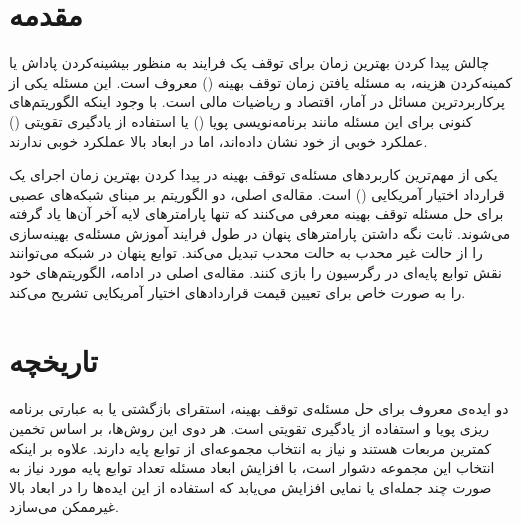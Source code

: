 \documentclass[hidelinks, 11pt]{article}
\author{علیرضا عظیمی‌نیا $401\,205\,061$ \\ کیانا عسگری $97\,100\,473$}
\date{}
\title{\lr{Optimal Stopping via Randomized Neural Networks}}
\begin{document}
\maketitle

\section{مقدمه}
\label{sec:org43aa378}

چالش پیدا کردن بهترین زمان برای توقف یک فرایند به منظور بیشینه‌کردن
پاداش یا کمینه‌کردن هزینه، به مسئله یافتن زمان توقف بهینه
() معروف است.  این مسئله یکی از
پرکاربردترین مسائل در آمار، اقتصاد و ریاضیات مالی است.  با وجود
اینکه الگوریتم‌های کنونی برای این مسئله مانند برنامه‌نویسی پویا
() یا استفاده از یادگیری تقویتی
() عملکرد خوبی از خود نشان داده‌اند، اما در
ابعاد بالا عملکرد خوبی ندارند.

یکی از مهم‌ترین کاربردهای مسئله‌ی توقف بهینه در پیدا کردن بهترین زمان
اجرای یک قرارداد اختیار آمریکایی () است.
مقاله‌ی اصلی، دو الگوریتم بر مبنای شبکه‌های عصبی برای حل مسئله توقف بهینه
معرفی می‌کنند که تنها پارامترهای لایه آخر آن‌ها یاد گرفته می‌شوند.  ثابت
نگه داشتن پارامترهای پنهان در طول فرایند آموزش مسئله‌ی بهینه‌سازی را از
حالت غیر محدب به حالت محدب تبدیل می‌کند.  توابع پنهان در شبکه می‌توانند
نقش توابع پایه‌ای در رگرسیون را بازی کنند.  مقاله‌ی اصلی در ادامه،
الگوریتم‌های خود را به صورت خاص برای تعیین قیمت قراردادهای اختیار
آمریکایی تشریح می‌کند.

\section{تاریخچه}
\label{sec:orgfb561e4}

دو ایده‌ی معروف برای حل مسئله‌ی توقف بهینه، استقرای بازگشتی یا به عبارتی
برنامه ریزی پویا
و استفاده از یادگیری تقویتی
است.  هر دوی این روش‌ها، بر اساس تخمین کمترین مربعات هستند و نیاز به
انتخاب مجموعه‌ای از توابع پایه دارند.  علاوه بر اینکه انتخاب این مجموعه
دشوار است، با افزایش ابعاد مسئله تعداد توابع پایه مورد نیاز به صورت چند
جمله‌ای یا نمایی افزایش می‌یابد که استفاده از این ایده‌ها را در ابعاد بالا
غیرممکن می‌سازد.
\end{document}
